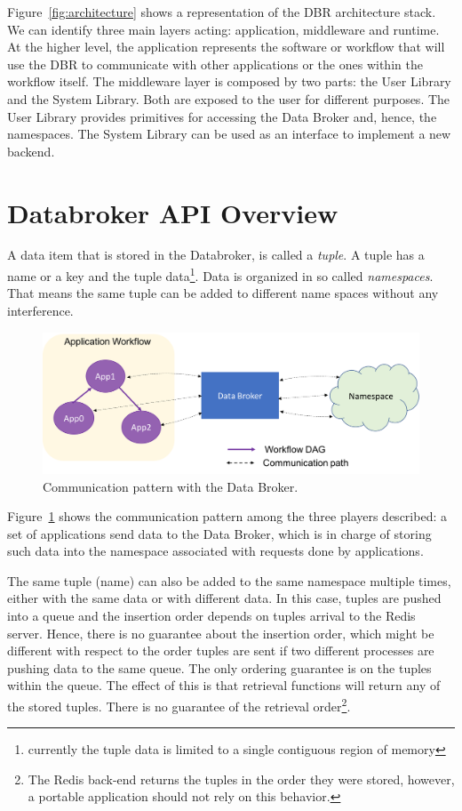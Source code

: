 Figure~\ref{fig:architecture} shows a representation of the DBR architecture stack.
We can identify three main layers acting:  application, middleware and runtime.
At the higher level, the application represents the software or workflow that will use the DBR to communicate with other applications or the ones within the workflow itself. 
The middleware layer is composed by two parts: the User Library and the System Library.
Both are exposed to the user for different purposes. The User Library provides primitives for accessing the Data Broker and, hence, the namespaces. The System Library can be used as an interface to implement a new backend.


\section{Databroker API Overview}

A data item that is stored in the Databroker, is called a \emph{tuple}.
A tuple has a name or a key and the tuple data\footnote{currently the
 tuple data is limited to a single contiguous region of memory}.
Data is organized in so called \emph{namespaces}. That means the same
tuple can be added to different name spaces without any interference.

\begin{figure}[!htb]
	\centering
	\includegraphics[width=\linewidth]{fig/dbrworkflow}
	\caption{Communication pattern with the Data Broker.}
	\label{fig:dbrworkflow}
\end{figure}

Figure~\ref{fig:dbrworkflow} shows the communication pattern among the three players described: a set of applications send data to the Data Broker, which is in charge of storing such data into the namespace associated with requests done by applications.


The same tuple (name) can also be added to the same namespace multiple
times, either with the same data or with different data. 
In this case, tuples are pushed into a queue and the insertion order depends on tuples arrival to the Redis server.
Hence, there is no guarantee about the insertion order, which might be different with respect to the order tuples are sent if two different processes are pushing data to the same queue. The only ordering guarantee is on the tuples within the queue.
The effect of this is that retrieval functions will return any of the stored
tuples. There is no guarantee of the retrieval order\footnote{The Redis
  back-end returns the tuples in the order they were stored, however,
  a portable application should not rely on this behavior.}.




